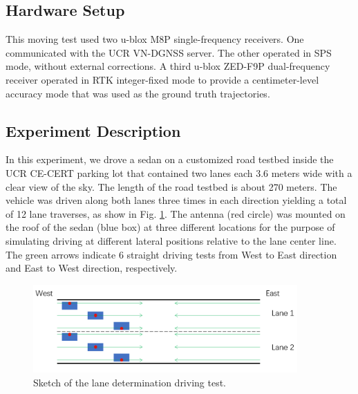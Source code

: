 \documentclass[letterpaper, 10 pt,onecolumn]{article}
\begin{document}
	\subsection{Hardware Setup}
	This moving test used two u-blox M8P single-frequency receivers. 
	One communicated with the UCR VN-DGNSS server. The other operated in SPS mode, without external corrections. A third u-blox ZED-F9P dual-frequency receiver operated in RTK integer-fixed mode to provide a centimeter-level accuracy mode that was used as the ground truth trajectories.
	
	\subsection{Experiment Description}
	In this experiment, we drove a sedan on a customized road testbed inside the UCR CE-CERT parking lot that contained two lanes each 3.6 meters wide with a clear view of the sky. 
	 The length of the road testbed is about 270 meters. The vehicle was driven along both lanes three times in each direction yielding a total of 12 lane traverses, as show in Fig. \ref{fig:LDsk}.
	The antenna (red circle) was mounted on the roof of the sedan (blue box) at three different locations for the purpose of simulating driving at different lateral positions relative to the lane center line. The green arrows indicate 6 straight driving tests from West to East direction and East to West direction, respectively. 
	\begin{figure}[H]		
		\centering		
		\includegraphics[width=0.9\textwidth]{figures/LDsketch.png}	
		\caption{Sketch of the lane determination driving test.}		
		\label{fig:LDsk}	
	\end{figure}
	
\end{document}
